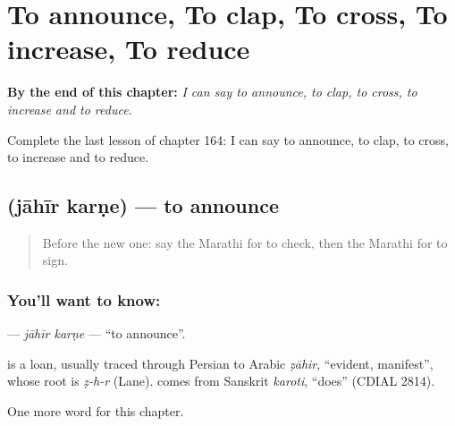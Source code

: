 
\chapter{To announce, To clap, To cross, To increase, To reduce}
\label{ch:mr-to-announce-to-clap-to-cross-to-increase-to-reduce}

\begin{chapteropening}
\textbf{By the end of this chapter:} \emph{I can say to announce, to clap, to cross, to increase and to reduce.}

Complete the last lesson of chapter 164: I can say to announce, to clap, to cross, to increase and to reduce.
\end{chapteropening}

\section[\texorpdfstring{\mr{जाहीर} \mr{करणे} (jāhīr karṇe)}{जाहीर करणे (jāhīr karṇe)}]{  (jāhīr karṇe) — to announce}

\label{lesson:MR-C164-jahir-karne}



\begin{quote}
Before the new one: say the Marathi for to check, then the Marathi for to sign.
\end{quote}

\subsection*{You'll want to know:  }
\textbf{ } — \emph{jāhīr karṇe} — \textquotedblleft{}to announce\textquotedblright{}.

\begin{cousinweb}
\textbf{} is a loan, usually traced through Persian to Arabic \emph{ẓāhir}, \textquotedblleft{}evident, manifest\textquotedblright{}, whose root is \emph{ẓ-h-r} (Lane). \textbf{} comes from Sanskrit \emph{karoti}, \textquotedblleft{}does\textquotedblright{} (CDIAL 2814).
\end{cousinweb}

\begin{grammarlens}[title={What you've built}]
One more word for this chapter.
\end{grammarlens}


